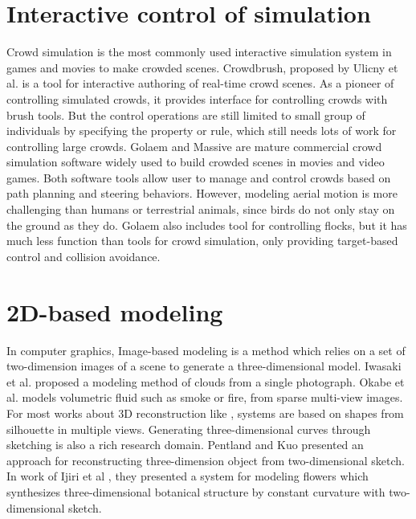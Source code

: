 \section{Interactive control of simulation}

Crowd simulation is the most commonly used interactive simulation system in games and movies to make crowded scenes. Crowdbrush, proposed by Ulicny et al. \cite{Brush} is a tool for interactive authoring of real-time crowd scenes. As a pioneer of controlling simulated crowds, it provides interface for controlling crowds with brush tools. But the control operations are still limited to small group of individuals by specifying the property or rule, which still needs lots of work for controlling large crowds. Golaem\cite{Golaem} and Massive\cite{Massive} are mature commercial crowd simulation software widely used to build crowded scenes in movies and video games. Both software tools allow user to manage and control crowds based on path planning and steering behaviors. However, modeling aerial motion is more challenging than humans or terrestrial animals, since birds do not only stay on the ground as they do. Golaem also includes tool for controlling flocks, but it has much less function than tools for crowd simulation, only providing target-based control and collision avoidance.

\section{2D-based modeling}

In computer graphics, Image-based modeling is a method which relies on a set of two-dimension images of a scene to generate a three-dimensional model. Iwasaki et al. \cite{Cloud} proposed a modeling method of clouds from a single photograph. Okabe et al. \cite{Fluid} models volumetric fluid such as smoke or fire, from sparse multi-view images. For most works about 3D reconstruction like \cite{Reconstruction}, systems are based on shapes from silhouette in multiple views. Generating three-dimensional curves through sketching is also a rich research domain. Pentland and Kuo \cite{Sketch} presented an approach for reconstructing three-dimension object from two-dimensional sketch. In work of Ijiri et al \cite{Plant}, they presented a system for modeling flowers which synthesizes three-dimensional botanical structure by constant curvature with two-dimensional sketch.